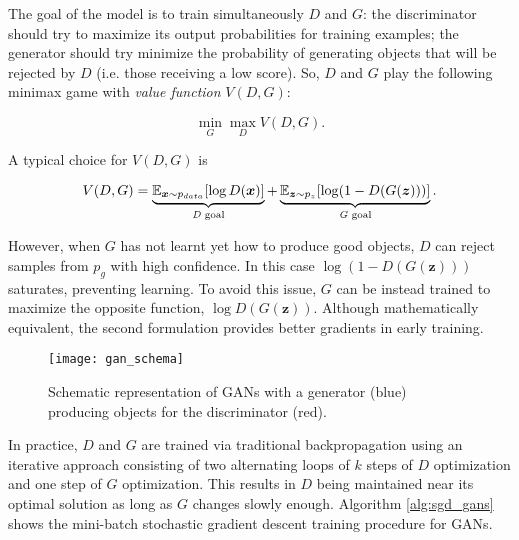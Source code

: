 The goal of the model is to train simultaneously $D$ and $G$: the discriminator should try to maximize its output probabilities for training examples; the generator should try minimize the probability of generating objects that will be rejected by $D$ (i.e. those receiving a low score). So, $D$ and $G$ play the following minimax game with \textit{value function} $V(D, G)$:

\begin{equation}
\min_G \max_D V(D, G).
\end{equation} 

A typical choice for $V(D, G)$ is

\begin{equation}
V(D, G) = \underbrace{\mathbb{E}_{\bm{x} \sim p_{data}} [\log D(\bm{x})]}_\textrm{\textit{D} goal} + \underbrace{\mathbb{E}_{\bm{z} \sim p_z} [\log (1 - D(G(\bm{z})))]}_\textrm{\textit{G} goal}.
\end{equation}

However, when $G$ has not learnt yet how to produce good objects, $D$ can reject samples from $p_g$ with high confidence. In this case $\log (1 - D(G(\bm{z})))$ saturates, preventing learning. To avoid this issue, $G$ can be instead trained to maximize the opposite function, $\log D(G(\bm{z}))$. Although mathematically equivalent, the second formulation provides better gradients in early training.

\begin{figure}[ht]
    \centering
    \texttt{[image: gan\_schema]}
    \caption{Schematic representation of GANs with a generator (blue) producing objects for the discriminator (red).}
\end{figure}

In practice, $D$ and $G$ are trained via traditional backpropagation using an iterative approach consisting of two alternating loops of $k$ steps of $D$ optimization and one step of $G$ optimization. This results in $D$ being maintained near its optimal solution as long as $G$ changes slowly enough. Algorithm \ref{alg:sgd_gans} shows the mini-batch stochastic gradient descent training procedure for GANs.

